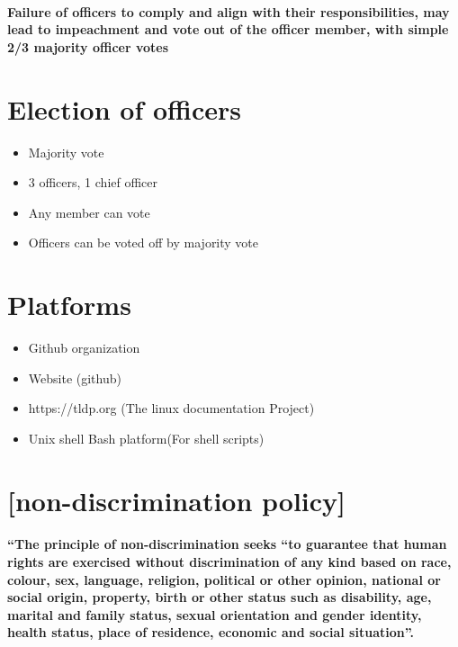 \documentclass[a4paper, 11pt]{amsart}
\begin{document}
\paragraph{Failure of officers to comply and align with their responsibilities, may lead to impeachment and vote out of the officer member, with simple 2/3 majority officer votes}


\section{Election of officers}
\begin{itemize}
    \item Majority vote
    \item 3 officers, 1 chief officer
    \item Any member can vote
    \item Officers can be voted off by majority vote
\end{itemize}

\section{Platforms}
\begin{itemize}
    \item Github organization

    \item Website (github)
    \item https://tldp.org (The linux documentation Project)
    \item Unix shell Bash platform(For shell scripts)
\end{itemize}

\section{[non-discrimination policy]}
\paragraph{“The principle of non-discrimination seeks “to guarantee that human rights are exercised without discrimination of any kind based on race, colour, sex, language, religion, political or other opinion, national or social origin, property, birth or other status such as disability, age, marital and family status, sexual orientation and gender identity, health status, place of residence, economic and social situation”.}
\end{document}
